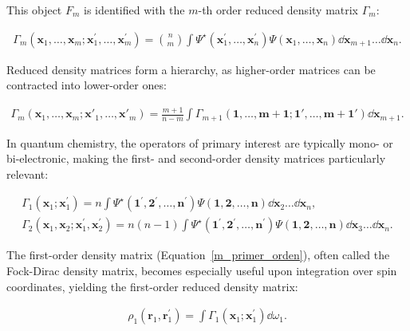
\noindent This object $F_m$ is identified with the $m$-th order reduced density matrix
$\Gamma_m$:

\footnotesize
\begin{align}
  \Gamma_m(\mathbf{x}_{1}, \ldots , \mathbf{x}_m; \mathbf{x}^\prime_1, \ldots , \mathbf{x}^\prime_m)
  = {n \choose m} \int
    \Psi^{\star}(\mathbf{x}^\prime_1,\ldots , \mathbf{x}^{\prime}_n)
    \Psi(\mathbf{x}_1,\ldots ,\mathbf{x}_n)
    \dd \mathbf{x}_{m+1}\ldots \dd \mathbf{x}_n .
\end{align}
\normalsize

\newpage
Reduced density matrices form a hierarchy, as higher-order matrices can be
contracted into lower-order ones:

\begin{align}
  \Gamma_m(\mathbf{x}_1, \ldots , \mathbf{x}_m; \mathbf{x}'_1, \ldots , \mathbf{x}'_m)
  = \frac{m+1}{n-m} \int \Gamma_{m+1}(\mathbf{1}, \ldots , \mathbf{m+1}; \mathbf{1}', \ldots , \mathbf{m+1}') \dd\mathbf{x}_{m+1}.
\end{align}

In quantum chemistry, the operators of primary interest are typically mono- or
bi-electronic, making the first- and second-order density matrices particularly
relevant:

\begin{gather}
  \label{m_primer_orden}
  \Gamma_1 (\mathbf{x}_1;\mathbf{x}_1^{\prime}) =
    n\int\Psi^\star(\mathbf{1}^\prime, \mathbf{2}^\prime, \ldots ,\mathbf{n}^\prime)
    \Psi(\mathbf{1}, \mathbf{2}, \ldots , \mathbf{n})
    \dd \mathbf{x}_2 \ldots \dd \mathbf{x}_n, \\
  \Gamma_2 (\mathbf{x}_1, \mathbf{x}_2;\mathbf{x}^\prime_1,\mathbf{x}^\prime_2)
    = n(n-1) \int\Psi^\star(\mathbf{1}^\prime, \mathbf{2}^\prime, \ldots ,\mathbf{n}^\prime)
    \Psi(\mathbf{1}, \mathbf{2}, \ldots , \mathbf{n}) \dd \mathbf{x}_3 \ldots \dd \mathbf{x}_n.
\end{gather}

The first-order density matrix (Equation~\ref{m_primer_orden}), often called the
Fock-Dirac density matrix, becomes especially useful upon integration over spin
coordinates, yielding the first-order reduced density matrix:

\begin{align}
  \rho_1(\mathbf{r}_1,\mathbf{r}^\prime_1) =
    \int\Gamma_1 (\mathbf{x}_1;\mathbf{x}_1^{\prime}) \dd \omega_1.
  \label{m_r_1}
\end{align}

